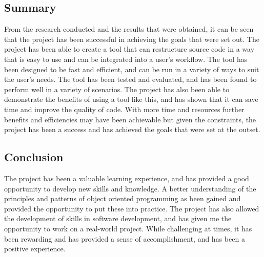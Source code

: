 \subsection{Summary}
From the research conducted and the results that were obtained, it can be seen that the project has been successful in achieving the goals that were set out. The project has been able to create a tool that can restructure source code in a way that is easy to use and can be integrated into a user's workflow. The tool has been designed to be fast and efficient, and can be run in a variety of ways to suit the user's needs. The tool has been tested and evaluated, and has been found to perform well in a variety of scenarios. The project has also been able to demonstrate the benefits of using a tool like this, and has shown that it can save time and improve the quality of code. With more time and resources further benefits and efficiencies may have been achievable but given the constraints, the project has been a success and has achieved the goals that were set at the outset.

\subsection{Conclusion}
The project has been a valuable learning experience, and has provided a good opportunity to develop new skills and knowledge. A better understanding of the principles and patterns of object oriented programming as been gained and provided the opportunity to put these into practice. The project has also allowed the development of skills in software development, and has given me the opportunity to work on a real-world project. While challenging at times, it has been rewarding and has provided a sense of accomplishment, and has been a positive experience.

